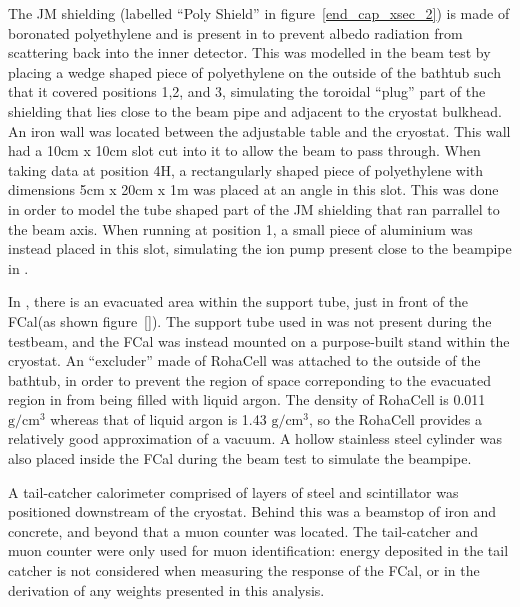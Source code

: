 The JM shielding (labelled ``Poly Shield'' in figure~\ref{end_cap_xsec_2}) is made of boronated polyethylene and is present in \atlas to prevent albedo radiation from scattering back into the inner detector. This was modelled in the beam test by placing a wedge shaped piece of polyethylene on the outside of the bathtub such that it covered positions 1,2, and 3, simulating the toroidal ``plug'' part of the shielding that lies close to the beam pipe and adjacent to the cryostat bulkhead. An iron wall was located between the adjustable table and the cryostat. This wall had a 10cm x 10cm slot cut into it to allow the beam to pass through. When taking data at position 4H, a rectangularly shaped piece of polyethylene with dimensions 5cm x 20cm x 1m was placed at an angle in this slot. This was done in order to model the tube shaped part of the JM shielding that ran parrallel to the beam axis. When running at position 1, a small piece of aluminium was instead placed in this slot, simulating the ion pump present close to the beampipe in \atlas.

In \atlas, there is an evacuated area within the support tube, just in front of the FCal(as shown figure~\ref{}). The support tube used in \atlas was not present during the testbeam, and the FCal was instead mounted on a purpose-built stand within the cryostat. An ``excluder'' made of RohaCell was attached to the outside of the bathtub, in order to prevent the region of space correponding to the evacuated region in \atlas from being filled with liquid argon.
 The density of RohaCell is 0.011 $\mathrm{g}/\mathrm{cm}^3$ whereas that of liquid argon is 1.43 $\mathrm{g}/\mathrm{cm}^3$, so the RohaCell provides a relatively good approximation of a vacuum. A hollow stainless steel cylinder was also placed inside the FCal during the beam test to simulate the beampipe.

A tail-catcher calorimeter comprised of layers of steel and scintillator was positioned downstream of the cryostat. Behind this was a beamstop of iron and concrete, and beyond that a muon counter was located. The tail-catcher and muon counter were only used for muon identification: energy deposited in the tail catcher is not considered when measuring the response of the FCal, or in the derivation of any weights presented in this analysis.

